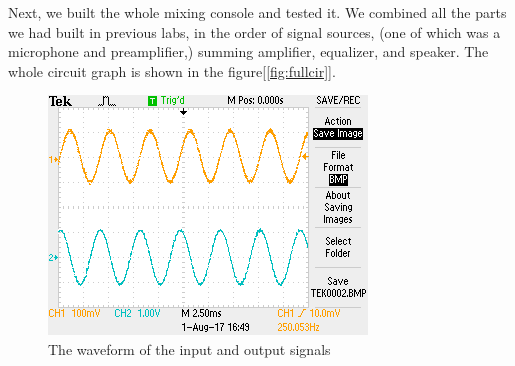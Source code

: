 Next, we built the whole mixing console and tested it.
\phantom{ } We combined all the parts we had built in previous labs, in the order of signal sources, (one of which was a microphone and preamplifier,) summing amplifier, equalizer, and speaker. The whole circuit graph is shown in the figure[\ref{fig:fullcir}].\\
\begin{figure}[!htbp]
	\centering
	\begin{framed}
		\includegraphics[width=\linewidth]{images/TEK0002.png}
		\caption{The waveform of the input and output signals}
		\label{fig:wave250}
	\end{framed}
\end{figure}

